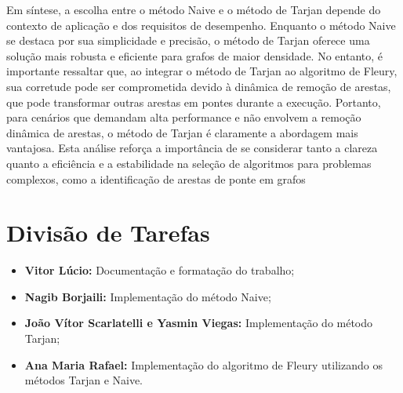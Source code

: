 \documentclass{sbc2023}%
\begin{document}
Em síntese, a escolha entre o método Naive e o método de Tarjan depende do contexto de aplicação e dos requisitos de desempenho. Enquanto o método Naive se destaca por sua simplicidade e precisão, o método de Tarjan oferece uma solução mais robusta e eficiente para grafos de maior densidade. No entanto, é importante ressaltar que, ao integrar o método de Tarjan ao algoritmo de Fleury, sua corretude pode ser comprometida devido à dinâmica de remoção de arestas, que pode transformar outras arestas em pontes durante a execução. Portanto, para cenários que demandam alta performance e não envolvem a remoção dinâmica de arestas, o método de Tarjan é claramente a abordagem mais vantajosa. Esta análise reforça a importância de se considerar tanto a clareza quanto a eficiência e a estabilidade na seleção de algoritmos para problemas complexos, como a identificação de arestas de ponte em grafos

\section{Divisão de Tarefas}
\begin{itemize}
\item \textbf{Vitor Lúcio:} Documentação e formatação do trabalho;
\item \textbf{Nagib Borjaili:} Implementação do método Naive;
\item \textbf{João Vítor Scarlatelli e Yasmin Viegas:} Implementação do método Tarjan;
\item \textbf{Ana Maria Rafael:} Implementação do algoritmo de Fleury utilizando os métodos Tarjan e Naive.
\end{itemize}



\end{document}
